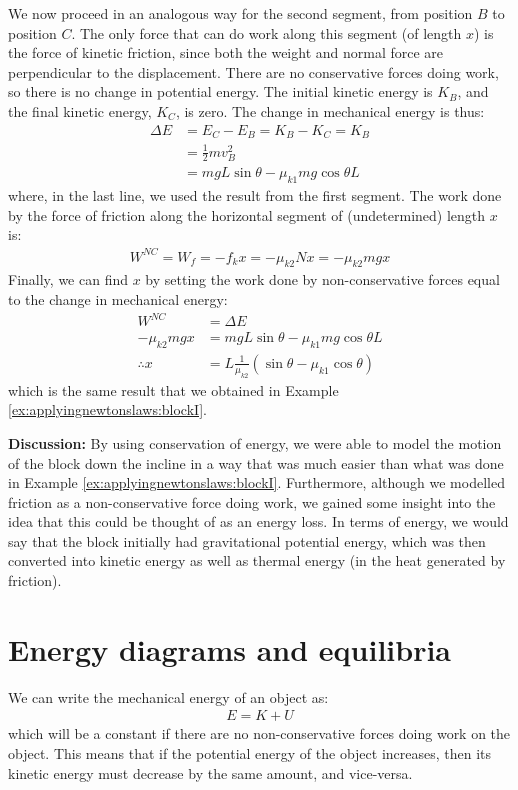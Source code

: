 \begin{example}
We now proceed in an analogous way for the second segment, from position $B$ to position $C$. The only force that can do work along this segment (of length $x$) is the force of kinetic friction, since both the weight and normal force are perpendicular to the displacement. There are no conservative forces doing work, so there is no change in potential energy. The initial kinetic energy is $K_B$, and the final kinetic energy, $K_C$, is zero. The change in mechanical energy is thus:
\begin{align*}
\Delta E &= E_C - E_B = K_B - K_C = K_B\\
&=\frac{1}{2}mv_B^2\\
&= mgL\sin\theta-\mu_{k1}mg\cos\theta L 
\end{align*}
where, in the last line, we used the result from the first segment. The work done by the force of friction along the horizontal segment of (undetermined) length $x$ is:
\begin{align*}
W^{NC}=W_f = -f_kx = -\mu_{k2} N x=-\mu_{k2} mg x
\end{align*}
Finally, we can find $x$ by setting the work done by non-conservative forces equal to the change in mechanical energy:
\begin{align*}
W^{NC} &= \Delta E\\
-\mu_{k2} mg x &= mgL\sin\theta-\mu_{k1}mg\cos\theta L \\
\therefore x&= L\frac{1}{\mu_{k2}}\left(\sin\theta - \mu_{k1}\cos\theta\right)
\end{align*}
which is the same result that we obtained in Example \ref{ex:applyingnewtonslaws:blockI}.

\textbf{Discussion:} By using conservation of energy, we were able to model the motion of the block down the incline in a way that was much easier than what was done in Example \ref{ex:applyingnewtonslaws:blockI}. Furthermore, although we modelled friction as a non-conservative force doing work, we gained some insight into the idea that this could be thought of as an energy loss. In terms of energy, we would say that the block initially had gravitational potential energy, which was then converted into kinetic energy as well as thermal energy (in the heat generated by friction). 
\end{example}

\section{Energy diagrams and equilibria}
\label{sec:potentialecons:ediagrams}
We can write the mechanical energy of an object as:
\begin{align*}
E = K + U
\end{align*}
which will be a constant if there are no non-conservative forces doing work on the object. This means that if the potential energy of the object increases, then its kinetic energy must decrease by the same amount, and vice-versa. 

